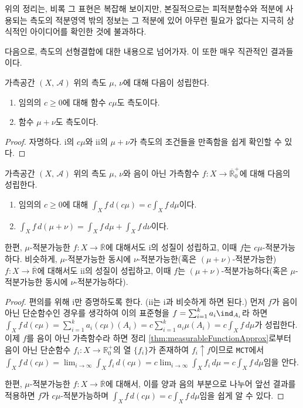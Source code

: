 위의 정리는, 비록 그 표현은 복잡해 보이지만, 본질적으로는 피적분함수와 적분에 사용되는 측도의 적분영역 밖의 정보는 그 적분에 있어 아무런 필요가 없다는 지극히 상식적인 아이디어를 확인한 것에 불과하다.

다음으로, 측도의 선형결합에 대한 내용으로 넘어가자. 이 또한 매우 직관적인 결과들이다.

\begin{theorem}
    가측공간 $(X,\,\mathcal{A})$ 위의 측도 $\mu,\,\nu$에 대해 다음이 성립한다.
    \begin{enumerate}
        \item 임의의 $c\geq0$에 대해 함수 $c\mu$도 측도이다.
        \item 함수 $\mu+\nu$도 측도이다.
    \end{enumerate}
\end{theorem}

\begin{proof}
    자명하다. i의 $c\mu$와 ii의 $\mu+\nu$가 측도의 조건들을 만족함을 쉽게 확인할 수 있다.
\end{proof}

\begin{theorem}\label{thm:linearCombiMeasure}
    가측공간 $(X,\,\mathcal{A})$ 위의 측도 $\mu,\,\nu$와 음이 아닌 가측함수 $f:X\to\overline{\mathbb{R}}^+_0$에 대해 다음의 성립한다.
    \begin{enumerate}
        \item 임의의 $c\geq0$에 대해 $\int_Xf\,d(c\mu)=c\int_Xf\,d\mu$이다.
        \item $\int_Xf\,d(\mu+\nu)=\int_Xf\,d\mu+\int_Xf\,d\nu$이다.
    \end{enumerate}
    한편, $\mu$-적분가능한 $f:X\to\overline{\mathbb{R}}$에 대해서도 i의 성질이 성립하고, 이때 $f$는 $c\mu$-적분가능하다. 비슷하게, $\mu$-적분가능한 동시에 $\nu$-적분가능한(혹은 $(\mu+\nu)$-적분가능한) $f:X\to\overline{\mathbb{R}}$에 대해서도 ii의 성질이 성립하고, 이때 $f$는 $(\mu+\nu)$-적분가능하다(혹은 $\mu$-적분가능한 동시에 $\nu$-적분가능하다).
\end{theorem}

\begin{proof}
    편의를 위해 i만 증명하도록 한다. (ii는 i과 비슷하게 하면 된다.) 먼저 $f$가 음이 아닌 단순함수인 경우를 생각하여 이의 표준형을 $f=\sum_{i=1}^ka_i\ind_{A_i}$라 하면 $\int_Xf\,d(c\mu)=\sum_{i=1}^ka_i(c\mu)(A_i)=c\sum_{i=1}^ka_i\mu(A_i)=c\int_Xf\,d\mu$가 성립한다. 이제 $f$를 음이 아닌 가측함수라 하면 정리 \ref{thm:measurableFunctionApprox}로부터 음이 아닌 단순함수 $f_i:X\to\mathbb{R}^+_0$의 열 $\{f_i\}$가 존재하여 $f_i\uparrow f$이므로 \texttt{MCT}에서 $\int_Xf\,d(c\mu)=\lim_{i\to\infty}\int_Xf_i\,d(c\mu)=c\lim_{i\to\infty}\int_Xf_i\,d\mu=c\int_Xf\,d\mu$임을 안다. 

    한편, $\mu$-적분가능한 $f:X\to\overline{\mathbb{R}}$에 대해서, 이를 양과 음의 부분으로 나누어 앞선 결과를 적용하면 $f$가 $c\mu$-적분가능하며 $\int_Xf\,d(c\mu)=c\int_Xf\,d\mu$임을 쉽게 알 수 있다.
\end{proof}

